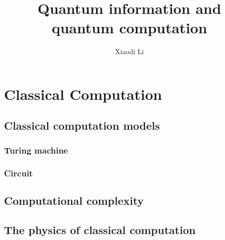 \documentclass{article}
\title{Quantum information and quantum computation}
\author{Xiaodi Li}
\begin{document}
	
\maketitle
\tableofcontents
\newpage



\section{Classical Computation}

\subsection{Classical computation models}

\subsubsection{Turing machine}

\subsubsection{Circuit}


\subsection{Computational complexity }


\subsection{The physics of classical computation}












\newpage
\end{document}
